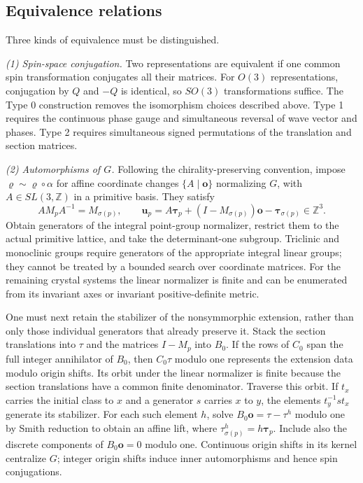 \documentclass{article}
\begin{document}
\subsection{Equivalence relations}

Three kinds of equivalence must be distinguished.

\textit{(1) Spin-space conjugation.}
Two representations are equivalent if one common spin transformation
conjugates all their matrices. For $O(3)$ representations, conjugation
by $Q$ and $-Q$ is identical, so $SO(3)$ transformations suffice.
The Type 0 construction removes the isomorphism choices described
above. Type 1 requires the continuous phase gauge and simultaneous
reversal of wave vector and phases. Type 2 requires simultaneous
signed permutations of the translation and section matrices.

\textit{(2) Automorphisms of $G$.}
Following the chirality-preserving convention, impose
$\varrho\sim\varrho\circ\alpha$ for affine coordinate changes
$\{A\mid\bm o\}$ normalizing $G$, with $A\in SL(3,\mathbb Z)$
in a primitive basis. They satisfy
\[
 A M_p A^{-1}=M_{\sigma(p)},\qquad
 \bm u_p=A\bm\tau_p+(I-M_{\sigma(p)})\bm o
                      -\bm\tau_{\sigma(p)}\in\mathbb Z^3.
\]
Obtain generators of the integral point-group normalizer, restrict
them to the actual primitive lattice, and take the determinant-one
subgroup. Triclinic and monoclinic groups require generators of the
appropriate integral linear groups; they cannot be treated by a
bounded search over coordinate matrices. For the remaining crystal
systems the linear normalizer is finite and can be enumerated from
its invariant axes or invariant positive-definite metric.

One must next retain the stabilizer of the nonsymmorphic extension,
rather than only those individual generators that already preserve
it. Stack the section translations into $\tau$ and the matrices
$I-M_p$ into $B_0$. If the rows of $C_0$ span the full integer
annihilator of $B_0$, then $C_0\tau$ modulo one represents the
extension data modulo origin shifts. Its orbit under the linear
normalizer is finite because the section translations have a common
finite denominator. Traverse this orbit. If $t_x$ carries the initial
class to $x$ and a generator $s$ carries $x$ to $y$, the elements
$t_y^{-1}s t_x$ generate its stabilizer. For each such element $h$,
solve $B_0\bm o=\tau-\tau^h$ modulo one by Smith reduction to obtain
an affine lift, where $\tau^h_{\sigma(p)}=h\bm\tau_p$.
Include also the discrete components of $B_0\bm o=0$ modulo one.
Continuous origin shifts in its kernel centralize $G$; integer origin
shifts induce inner automorphisms and hence spin conjugations.
\end{document}
